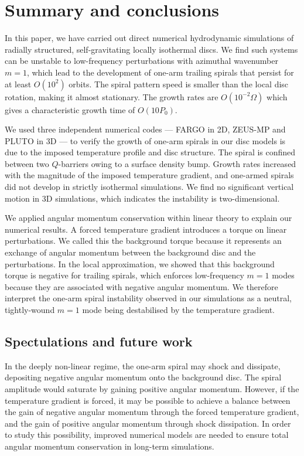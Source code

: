 \section{Summary and conclusions}\label{summary}
In this paper, we have carried out direct numerical hydrodynamic
simulations of radially structured, self-gravitating locally
isothermal discs.     
We find such systems can be unstable to low-frequency perturbations
with azimuthal wavenumber $m=1$, which lead to the development of one-arm 
trailing spirals that persist for at least $O(10^2)$ orbits. The 
spiral pattern speed is smaller than the local disc rotation, making
it almost stationary. The growth rates are $O(10^{-2}\Omega)$ which
gives a characteristic growth time of $O(10P_0)$. 

We used three independent numerical codes --- FARGO in 2D, ZEUS-MP and
PLUTO in 3D --- to verify the growth of  
one-arm spirals in our disc models is due to the imposed temperature
profile and disc structure. The spiral is confined between two
$Q$-barriers owing to a surface density bump. Growth rates increased
with the magnitude of the imposed temperature gradient, and one-armed
spirals did not develop in strictly isothermal simulations.  
We find no significant vertical 
motion in 3D simulations, which indicates the instability is
two-dimensional. 

We applied angular momentum conservation within linear theory to
explain our numerical results. A  
forced temperature gradient introduces a torque on linear 
perturbations. We called this the background torque because it
represents an exchange of angular momentum between the background disc
and the perturbations. In the local approximation, we showed that this
background torque is negative for trailing spirals, which enforces  
low-frequency $m=1$ modes because they are associated with negative
angular momentum. We therefore interpret the one-arm spiral instability
observed in our simulations as a neutral, tightly-wound $m=1$ mode
being destabilised by the temperature gradient.  

\subsection{Spectulations and future work}
In the deeply non-linear regime, the one-arm spiral may 
shock and dissipate, depositing negative angular momentum onto
the background disc. The spiral amplitude would saturate by gaining
positive angular momentum. However, if the temperature gradient is
forced, it may be possible to achieve a balance between the gain of negative
angular momentum through the forced temperature gradient, and the gain
of positive angular momentum through shock dissipation. In order to
study this possibility, improved numerical models are needed to ensure 
total angular momentum conservation in long-term simulations.  

